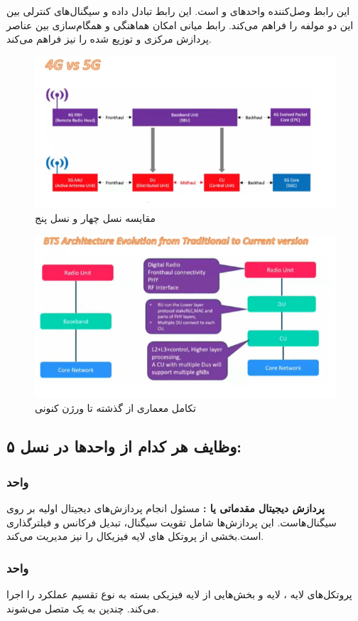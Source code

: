 \documentclass[landscape, 12pt]{report}
\begin{document}
این رابط وصل‌کننده واحدهای
  و
    است. این رابط تبادل داده و سیگنال‌های کنترلی بین این دو مولفه را فراهم می‌کند. رابط میانی امکان هماهنگی و همگام‌سازی بین عناصر پردازش مرکزی و توزیع شده را  نیز فراهم می‌کند.
    
\begin{figure}[ht]
   	\centering
   	\includegraphics[width=.6\linewidth]{Pic/4G_5G}
   	\caption{مقایسه نسل چهار و نسل پنج
   	}
   	\label{fig:4G_5G}
\end{figure}

\begin{figure}[ht]
   	\centering
   	\includegraphics[width=.6\linewidth]{Pic/BTS_Evaluation}
   	\caption{تکامل معماری
   		    		از گذشته تا ورژن کنونی
    	}
   	\label{fig:BTS_Evaluation}
\end{figure}
\subsection*{وظایف هر کدام از واحدها در نسل ۵:}
\subsubsection*{واحد
	 }
\textbf{پردازش دیجیتال مقدماتی یا
 :} 
مسئول انجام پردازش‌های دیجیتال اولیه بر روی سیگنال‌هاست. این پردازش‌ها شامل تقویت سیگنال، تبدیل فرکانس و فیلترگذاری است.بخشی از پروتکل های لایه فیزیکال را نیز مدیریت می‌کند.
\subsubsection*{واحد
	 }
پروتکل‌های لایه
، لایه
  و بخش‌هایی از لایه فیزیکی بسته به نوع تقسیم عملکرد را اجرا می‌کند. چندین
    به یک
      متصل می‌شوند.
\end{document}
